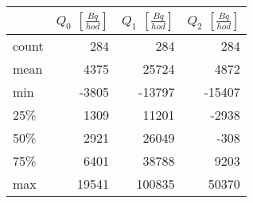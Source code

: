 \begin{tabular}{lrrr}
\toprule
{} &  $Q_0$ $\left[\si{\frac{Bq}{hod}}\right]$ &  $Q_1$ $\left[\si{\frac{Bq}{hod}}\right]$ &  $Q_2$ $\left[\si{\frac{Bq}{hod}}\right]$ \\
\midrule
count &                                       284 &                                       284 &                                       284 \\
mean  &                                      4375 &                                     25724 &                                      4872 \\
min   &                                     -3805 &                                    -13797 &                                    -15407 \\
25\%   &                                      1309 &                                     11201 &                                     -2938 \\
50\%   &                                      2921 &                                     26049 &                                      -308 \\
75\%   &                                      6401 &                                     38788 &                                      9203 \\
max   &                                     19541 &                                    100835 &                                     50370 \\
\bottomrule
\end{tabular}
